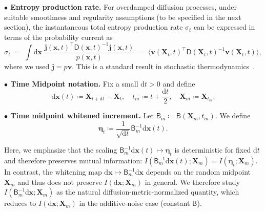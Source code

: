 \documentclass[
 longbibliography,
 twocolumn,
 superscriptaddress,
 amsmath,
 amssymb,
 amsthm,
 amsfonts,
 prl,
 floatfix,
]{revtex4-2}
\newcommand{\matbf}[1]{\boldsymbol{\mathsf{#1}}}
\begin{document}
\begin{widetext}
\medskip
\noindent\textbf{$\bullet$ Entropy production rate.}
For overdamped diffusion processes, under suitable smoothness and regularity assumptions (to be specified in the next section), 
the instantaneous total entropy production rate $\sigma_t$ can be expressed in terms of the probability current as
\begin{equation}
    \sigma_t
    \;=\;\int \mathrm{d}\bm{x}\;
    \frac{\bm{j}(\bm{x},t)^\intercal \matbf{D}(\bm{x},t)^{-1}\bm{j}(\bm{x},t)}{p(\bm{x},t)}
    \;=\;\big\langle \bm{v}(\bm{X}_t,t)^\intercal \matbf{D}(\bm{X}_t,t)^{-1}\bm{v}(\bm{X}_t,t)\big\rangle,
    \label{seq:ep_rate}
\end{equation}
where we used $\bm{j}=p\bm{v}$. This is a standard result in stochastic thermodynamics~\cite{seifert2012stochastic}.

\bigskip
\noindent\textbf{$\bullet$ Time Midpoint notation.} Fix a small $\mathrm{d}t>0$ and define
\begin{equation}
    \mathrm{d}\bm{x}(t)\coloneq\bm{X}_{t+\mathrm{d}t}-\bm{X}_t,
    \quad
    t_m\coloneq t+\frac{\mathrm{d}t}{2},
    \quad
    \bm{X}_m\coloneq\bm{X}_{t_m}.
    \label{seq:midpoint_notation}
\end{equation}

\noindent\textbf{$\bullet$ Time midpoint whitened increment.} Let $\matbf{B}_m\coloneq\matbf{B}(\bm{X}_m,t_m)$. We define
\begin{equation}
    \bm{\eta}_t\coloneq\frac{1}{\sqrt{\mathrm{d}t}}\matbf{B}_m^{-1}\mathrm{d}\bm{x}(t).
    \label{seq:def_Binv_dx}
\end{equation}

Here, we emphasize that the scaling $\matbf{B}_m^{-1}\mathrm{d}\bm{x}(t)\mapsto\bm{\eta}_t$ is deterministic for fixed $\mathrm{d}t$ and therefore preserves mutual information: $I(\matbf{B}_m^{-1}\mathrm{d}\bm{x}(t);\bm{X}_m)=I(\bm{\eta}_t;\bm{X}_m)$. In contrast, the whitening map $\mathrm{d}\bm{x}\mapsto\matbf{B}_m^{-1}\mathrm{d}\bm{x}$ depends on the random midpoint $\bm{X}_m$ and thus does not preserve $I(\mathrm{d}\bm{x};\bm{X}_m)$ in general. We therefore study $I(\matbf{B}_m^{-1}\mathrm{d}\bm{x};\bm{X}_m)$ as the natural diffusion-metric-normalized quantity, which reduces to $I(\mathrm{d}\bm{x};\bm{X}_m)$ in the additive-noise case (constant $\matbf{B}$).


\end{widetext}
\end{document}
